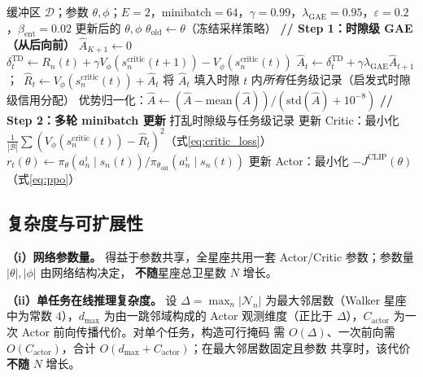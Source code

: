 \documentclass[a4paper,11pt]{article}
\begin{document}
\begin{algorithm}[t]
\caption{DA-MAPPO 网络参数更新（训练层）}
\label{alg:training}
\begin{algorithmic}[1]
\REQUIRE 缓冲区 $\mathcal{D}$；参数 $\theta,\phi$；$E{=}2$，minibatch${=}64$，$\gamma{=}0.99$，$\lambda_{\mathrm{GAE}}{=}0.95$，$\varepsilon{=}0.2$，$\beta_{\mathrm{ent}}{=}0.02$
\ENSURE 更新后的 $\theta,\phi$
\STATE $\theta_{\mathrm{old}} \leftarrow \theta$（冻结采样策略）
\STATE \textbf{// Step 1：时隙级 GAE（从后向前）}
  \STATE $\hat{A}_{K+1} \leftarrow 0$
    \STATE $\delta^{\mathrm{TD}}_t \leftarrow R_n(t) + \gamma V_\phi(s^{\mathrm{critic}}_n(t\!+\!1)) - V_\phi(s^{\mathrm{critic}}_n(t))$
    \STATE $\hat{A}_t \leftarrow \delta^{\mathrm{TD}}_t + \gamma\lambda_{\mathrm{GAE}}\hat{A}_{t+1}$；\ $\hat{R}_t \leftarrow V_\phi(s^{\mathrm{critic}}_n(t)) + \hat{A}_t$
    \STATE 将 $\hat{A}_t$ 填入时隙 $t$ 内\emph{所有}任务级记录（启发式时隙级信用分配）
  \ENDFOR
\ENDFOR
\STATE 优势归一化：$\hat{A} \leftarrow (\hat{A}-\mathrm{mean}(\hat{A}))/(\mathrm{std}(\hat{A})+10^{-8})$
\STATE \textbf{// Step 2：多轮 minibatch 更新}
  \STATE 打乱时隙级与任务级记录
    \STATE 更新 Critic：最小化 $\frac{1}{|\mathcal{B}|}\sum(V_\phi(s^{\mathrm{critic}}_n(t))-\hat{R}_t)^2$（式\eqref{eq:critic_loss}）
    \STATE $r_t(\theta) \leftarrow \pi_\theta(a^i_n\mid s_n(t))/\pi_{\theta_{\mathrm{old}}}(a^i_n\mid s_n(t))$
    \STATE 更新 Actor：最小化 $-J^{\mathrm{CLIP}}(\theta)$（式\eqref{eq:ppo}）
  \ENDFOR
\ENDFOR
\end{algorithmic}
\end{algorithm}

\subsection{复杂度与可扩展性}
\label{subsec:complexity}

\noindent\textbf{（i）网络参数量。}
得益于参数共享，全星座共用一套 Actor/Critic 参数；参数量 $|\theta|,|\phi|$ 由网络结构决定，
\textbf{不随}星座总卫星数 $N$ 增长。

\noindent\textbf{（ii）单任务在线推理复杂度。}
设 $\Delta=\max_n|\mathcal{N}_n|$ 为最大邻居数（Walker 星座中为常数 $4$），$d_{\max}$ 为由一跳邻域构成的
Actor 观测维度（正比于 $\Delta$），$C_{\mathrm{actor}}$ 为一次 Actor 前向传播代价。对单个任务，构造可行掩码
需 $O(\Delta)$、一次前向需 $O(C_{\mathrm{actor}})$，合计 $O(d_{\max}+C_{\mathrm{actor}})$；在最大邻居数固定且参数
共享时，该代价\textbf{不随} $N$ 增长。
\end{document}
